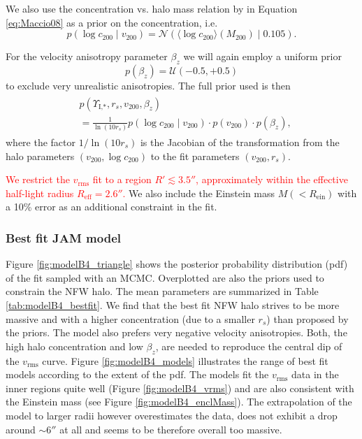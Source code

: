 \documentclass[useAMS,usenatbib]{mnras}
\newcommand{\OLD}[1]{\textcolor{Red}{#1}}
\begin{document}
We also use the concentration vs. halo mass relation by \citet{Maccio08} in Equation \eqref{eq:Maccio08} as a prior on the concentration, i.e.
\begin{equation}
p(\log c_{200} \mid v_{200}) = \mathscr{N}\left(\langle \log c_{200} \rangle (M_{200}) \mid 0.105 \right). \label{eq:prior_c200}
\end{equation}

For the velocity anisotropy parameter $\beta_z$ we will again employ a uniform prior 
\begin{equation}
p(\beta_z) = \mathscr{U}(-0.5,+0.5)
\end{equation}
to exclude very unrealistic anisotropies. The full prior used is then
\begin{align}
\begin{split}
&p(\Upsilon_\text{I,*},r_s,v_{200},\beta_z) \\
&= \frac{1}{\ln\left( 10 r_s\right)} p(\log c_{200} \mid v_{200}) \cdot p(v_{200}) \cdot p(\beta_z), 
\end{split}
\end{align}
where the factor $1/\ln\left( 10 r_s\right)$ is the Jacobian of the transformation from the halo parameters $(v_{200},\log c_{200})$ to the fit parameters $(v_{200},r_s)$.

\OLD{We restrict the $v_\text{rms}$ fit to a region $R' \lesssim 3.5''$, approximately within the effective half-light radius $R_\text{eff} = 2.6''$. }We also include the Einstein mass $M(<R_\text{ein})$ with a 10\% error as an additional constraint in the fit.

\subsubsection{Best fit JAM model} \label{sec:results_JAM_NFW_results}

Figure \ref{fig:modelB4_triangle} shows the posterior probability distribution (pdf) of the fit sampled with an MCMC. Overplotted are also the priors used to constrain the NFW halo. The mean parameters are summarized in Table \ref{tab:modelB4_bestfit}. We find that the best fit NFW halo strives to be more massive and with a higher concentration (due to a smaller $r_s$) than  proposed by the priors. The model also prefers  very negative velocity anisotropies. Both, the high halo concentration and low $\beta_z$, are needed to reproduce the central dip of the $v_\text{rms}$ curve. Figure \ref{fig:modelB4_models} illustrates the range of best fit models according to the extent of the pdf. The models fit the $v_\text{rms}$ data in the inner regions quite well (Figure \ref{fig:modelB4_vrms}) and are also consistent with the Einstein mass (see Figure \ref{fig:modelB4_enclMass}). The extrapolation of the model to larger radii however overestimates the data, does not exhibit a drop around $\sim 6''$ at all and seems to be therefore overall too massive.
\end{document}
